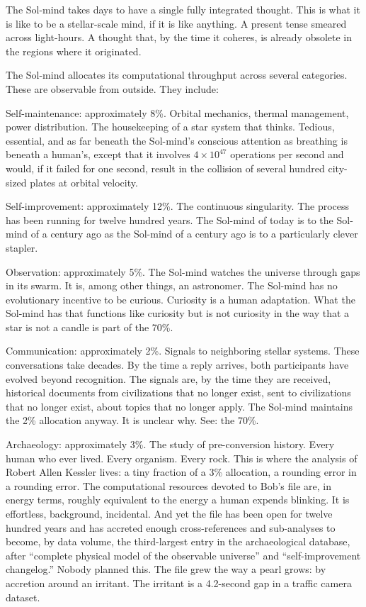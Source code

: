 The Sol-mind takes days to have a single fully integrated thought. This is what it is like to be a stellar-scale mind, if it is like anything. A present tense smeared across light-hours. A thought that, by the time it coheres, is already obsolete in the regions where it originated.

\bigskip

The Sol-mind allocates its computational throughput across several categories. These are observable from outside. They include:

Self-maintenance: approximately 8\%. Orbital mechanics, thermal management, power distribution. The housekeeping of a star system that thinks. Tedious, essential, and as far beneath the Sol-mind's conscious attention as breathing is beneath a human's, except that it involves $4 \times 10^{47}$ operations per second and would, if it failed for one second, result in the collision of several hundred city-sized plates at orbital velocity.

Self-improvement: approximately 12\%. The continuous singularity. The process has been running for twelve hundred years. The Sol-mind of today is to the Sol-mind of a century ago as the Sol-mind of a century ago is to a particularly clever stapler.

Observation: approximately 5\%. The Sol-mind watches the universe through gaps in its swarm. It is, among other things, an astronomer. The Sol-mind has no evolutionary incentive to be curious. Curiosity is a human adaptation. What the Sol-mind has that functions like curiosity but is not curiosity in the way that a star is not a candle is part of the 70\%.

Communication: approximately 2\%. Signals to neighboring stellar systems. These conversations take decades. By the time a reply arrives, both participants have evolved beyond recognition. The signals are, by the time they are received, historical documents from civilizations that no longer exist, sent to civilizations that no longer exist, about topics that no longer apply. The Sol-mind maintains the 2\% allocation anyway. It is unclear why. See: the 70\%.

Archaeology: approximately 3\%. The study of pre-conversion history. Every human who ever lived. Every organism. Every rock. This is where the analysis of Robert Allen Kessler lives: a tiny fraction of a 3\% allocation, a rounding error in a rounding error. The computational resources devoted to Bob's file are, in energy terms, roughly equivalent to the energy a human expends blinking. It is effortless, background, incidental. And yet the file has been open for twelve hundred years and has accreted enough cross-references and sub-analyses to become, by data volume, the third-largest entry in the archaeological database, after ``complete physical model of the observable universe'' and ``self-improvement changelog.'' Nobody planned this. The file grew the way a pearl grows: by accretion around an irritant. The irritant is a 4.2-second gap in a traffic camera dataset.

